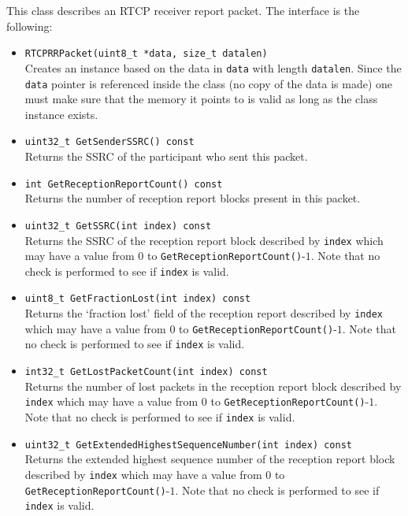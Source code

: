 \documentclass[12pt,a4paper]{article}
\begin{document}
					This class describes an RTCP receiver report packet. The interface
					is the following:
					\begin{itemize}
						\item {\tt RTCPRRPacket(uint8\_t *data, size\_t datalen)}\\
							Creates an instance based on the data in {\tt data} with
							length {\tt datalen}. Since the {\tt data} pointer
							is referenced inside the class (no copy of the data is
							made) one must make sure that the memory it points to is
							valid as long as the class instance exists.
						\item {\tt uint32\_t GetSenderSSRC() const}\\
							Returns the SSRC of the participant who sent this packet.
						\item {\tt int GetReceptionReportCount() const}\\
							Returns the number of reception report blocks present
							in this packet.
						\item {\tt uint32\_t GetSSRC(int index) const}\\
							Returns the SSRC of the reception report block described
							by {\tt index} which may have a value from $0$ to
							{\tt GetReceptionReportCount()}-$1$. Note that no
							check is performed to see if {\tt index} is valid.
						\item {\tt uint8\_t GetFractionLost(int index) const}\\
							Returns the `fraction lost' field of the reception 
							report described by {\tt index} which may have a value 
							from $0$ to {\tt GetReceptionReportCount()}-$1$. Note that 
							no check is performed to see if {\tt index} is valid.
						\item {\tt int32\_t GetLostPacketCount(int index) const}\\
							Returns the number of lost packets in the reception 
							report block described by {\tt index} which may have a value 
							from $0$ to {\tt GetReceptionReportCount()}-$1$. Note that 
							no check is performed to see if {\tt index} is valid.
						\item {\tt uint32\_t GetExtendedHighestSequenceNumber(int index) const}\\
							Returns the extended highest sequence number of the reception 
							report block described by {\tt index} which may have a value 
							from $0$ to {\tt GetReception\-Report\-Count()}-$1$. Note that 
							no check is performed to see if {\tt index} is valid.

\end{itemize}
\end{document}
